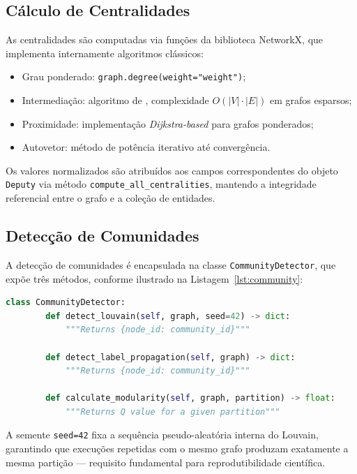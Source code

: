\documentclass[
      12pt,
      a4paper,
      openright,
      oneside,
      chapter=TITLE,
      section=TITLE,
      english,
      french,
      spanish,
      brazilian
    ]{abntex2}
\begin{document}
    \subsection{Cálculo de Centralidades}
    
    As centralidades são computadas via funções da biblioteca NetworkX, que implementa internamente algoritmos clássicos:
    
    \begin{itemize}
        \item Grau ponderado: \texttt{graph.degree(weight="weight")};
        \item Intermediação: algoritmo de \cite{brandes2001}, complexidade $O(|V| \cdot |E|)$ em grafos esparsos;
        \item Proximidade: implementação \textit{Dijkstra-based} para grafos ponderados;
        \item Autovetor: método de potência iterativo até convergência.
    \end{itemize}
    
    Os valores normalizados são atribuídos aos campos correspondentes do objeto \texttt{Deputy} via método \texttt{compute\_all\_centralities}, mantendo a integridade referencial entre o grafo e a coleção de entidades.
    
    \subsection{Detecção de Comunidades}
    
    A detecção de comunidades é encapsulada na classe \texttt{CommunityDetector}, que expõe três métodos, conforme ilustrado na Listagem~\ref{lst:community}:
    
    \begin{lstlisting}[language=Python, caption={Interface da classe CommunityDetector.}, label={lst:community}]
    class CommunityDetector:
        def detect_louvain(self, graph, seed=42) -> dict:
            """Returns {node_id: community_id}"""
    
        def detect_label_propagation(self, graph) -> dict:
            """Returns {node_id: community_id}"""
    
        def calculate_modularity(self, graph, partition) -> float:
            """Returns Q value for a given partition"""
    \end{lstlisting}
    
    A semente \texttt{seed=42} fixa a sequência pseudo-aleatória interna do Louvain, garantindo que execuções repetidas com o mesmo grafo produzam exatamente a mesma partição --- requisito fundamental para reprodutibilidade científica.
    
\end{document}
